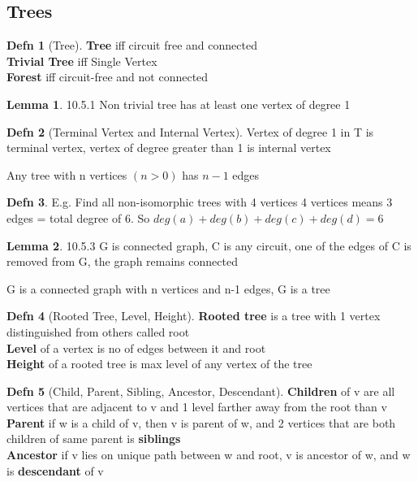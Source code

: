 \documentclass[a4paper]{article}
\theoremstyle{definition}
\newtheorem*{defn}{Defn}
\newtheorem*{lemma}{Lemma}
\newenvironment{theorem}[1]
  {\renewcommand\theinnertheorem{#1}\innertheorem}
  {\endinnertheorem}
\begin{document}
\subsection*{Trees}

\begin{defn}[Tree] \textbf{Tree} iff circuit free and connected\\
  \textbf{Trivial Tree} iff Single Vertex\\
\textbf{Forest} iff circuit-free and not connected \end{defn}

\begin{lemma}{10.5.1} Non trivial tree has at least one vertex of degree 1 \end{lemma}

\begin{defn}[Terminal Vertex and Internal Vertex] Vertex of degree 1 in T is terminal vertex, vertex of degree greater than 1 is internal vertex \end{defn}

\begin{theorem}{10.5.2} Any tree with n vertices $(n > 0)$ has $n-1$ edges \end{theorem}

\begin{defn}E.g. Find all non-isomorphic trees with 4 vertices
  4 vertices means 3 edges = total degree of 6. So $deg(a) + deg(b) + deg(c) + deg(d) = 6$
\end{defn}

\begin{lemma}{10.5.3} G is connected graph, C is any circuit, one of the edges of C is removed from G, the graph remains connected \end{lemma}

\begin{theorem}{10.5.4} G is a connected graph with n vertices and n-1 edges, G is a tree \end{theorem}

\begin{defn}[Rooted Tree, Level, Height] \textbf{Rooted tree} is a tree with 1 vertex distinguished from others called root\\
  \textbf{Level} of a vertex is no of edges between it and root\\
  \textbf{Height} of a rooted tree is max level of any vertex of the tree
\end{defn}

\begin{defn}[Child, Parent, Sibling, Ancestor, Descendant]
  \textbf{Children} of v are all vertices that are adjacent to v and 1 level farther away from the root than v\\
  \textbf{Parent} if w is a child of v, then v is parent of w, and 2 vertices that are both children of same parent is \textbf{siblings} \\
  \textbf{Ancestor} if v lies on unique path between w and root, v is ancestor of w, and w is \textbf{descendant} of v\\
\end{defn}
\end{document}
